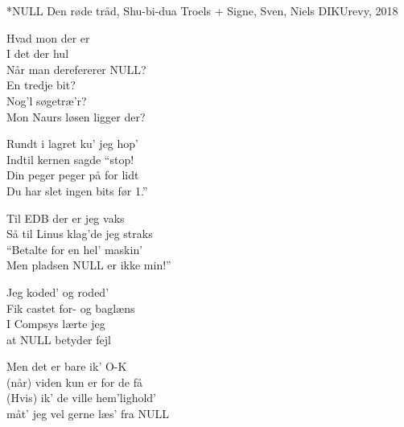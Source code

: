 \begin{song}{*NULL}
  {} %
  {Den røde tråd, Shu-bi-dua} %
  {Troels + Signe, Sven, Niels} %
  {DIKUrevy, 2018} %
  {\NotCCLIed} %

\begin{SBSection*}
  Hvad mon der er \\
  I det der hul \\
  Når man derefererer NULL? \\
  En tredje bit? \\
  Nog'l søgetræ'r? \\
  Mon Naurs løsen ligger der? \\
\end{SBSection*}
  
\begin{SBVerse}
  Rundt i lagret ku' jeg hop' \\
  Indtil kernen sagde ``stop! \\
  Din peger peger på for lidt \\
  Du har slet ingen bits før 1.'' \\ \medskip
\end{SBVerse}  

\begin{SBVerse}
  Til EDB der er jeg vaks \\
  Så til Linus klag'de jeg straks \\
  ``Betalte for en hel' maskin' \\
  Men pladsen NULL er ikke min!'' \\
\end{SBVerse}

\begin{SBChorus}
  Jeg koded' og roded' \\
  Fik castet for- og baglæns \\
  I Compsys lærte jeg \\
  at NULL betyder fejl \\ \medskip
  
  Men det er bare ik' O-K \\
  (når) viden kun er for de få \\
  (Hvis) ik' de ville hem'lighold' \\
  måt' jeg vel gerne læs' fra NULL \\ \medskip
  

\end{SBChorus}
\end{song}
